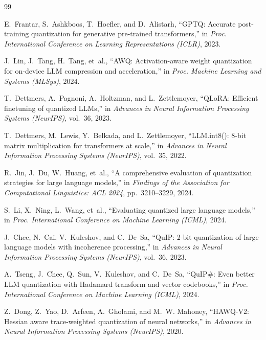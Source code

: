\documentclass[12pt,a4paper,oneside]{report}
\begin{document}
\begin{thebibliography}{99}

E.~Frantar, S.~Ashkboos, T.~Hoefler, and D.~Alistarh,
``GPTQ: Accurate post-training quantization for generative pre-trained transformers,''
in \textit{Proc. International Conference on Learning Representations (ICLR)}, 2023.

J.~Lin, J.~Tang, H.~Tang, et~al.,
``AWQ: Activation-aware weight quantization for on-device LLM compression and acceleration,''
in \textit{Proc. Machine Learning and Systems (MLSys)}, 2024.

T.~Dettmers, A.~Pagnoni, A.~Holtzman, and L.~Zettlemoyer,
``QLoRA: Efficient finetuning of quantized LLMs,''
in \textit{Advances in Neural Information Processing Systems (NeurIPS)}, vol.~36, 2023.

T.~Dettmers, M.~Lewis, Y.~Belkada, and L.~Zettlemoyer,
``LLM.int8(): 8-bit matrix multiplication for transformers at scale,''
in \textit{Advances in Neural Information Processing Systems (NeurIPS)}, vol.~35, 2022.

R.~Jin, J.~Du, W.~Huang, et~al.,
``A comprehensive evaluation of quantization strategies for large language models,''
in \textit{Findings of the Association for Computational Linguistics: ACL 2024}, pp.~3210--3229, 2024.

S.~Li, X.~Ning, L.~Wang, et~al.,
``Evaluating quantized large language models,''
in \textit{Proc. International Conference on Machine Learning (ICML)}, 2024.

J.~Chee, N.~Cai, V.~Kuleshov, and C.~De~Sa,
``QuIP: 2-bit quantization of large language models with incoherence processing,''
in \textit{Advances in Neural Information Processing Systems (NeurIPS)}, vol.~36, 2023.

A.~Tseng, J.~Chee, Q.~Sun, V.~Kuleshov, and C.~De~Sa,
``QuIP\#: Even better LLM quantization with Hadamard transform and vector codebooks,''
in \textit{Proc. International Conference on Machine Learning (ICML)}, 2024.

Z.~Dong, Z.~Yao, D.~Arfeen, A.~Gholami, and M.~W. Mahoney,
``HAWQ-V2: Hessian aware trace-weighted quantization of neural networks,''
in \textit{Advances in Neural Information Processing Systems (NeurIPS)}, 2020.


\end{thebibliography}
\end{document}
